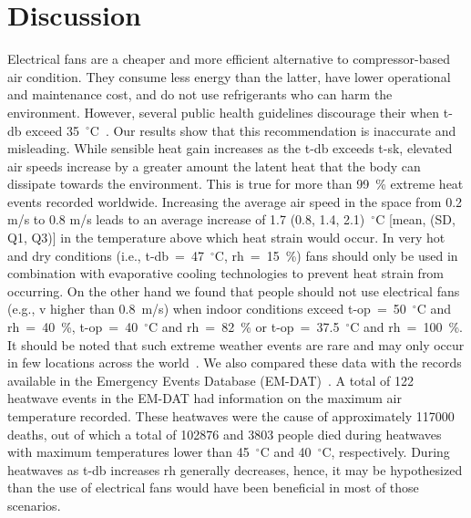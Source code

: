 
\section{Discussion}\label{sec:discussion}

Electrical fans are a cheaper and more efficient alternative to compressor-based air condition.
They consume less energy than the latter, have lower operational and maintenance cost, and do not use refrigerants who can harm the environment.
However, several public health guidelines discourage their when \acf{t-db} exceed 35~$^{\circ}$C~\cite{WMO2015}.
Our results show that this recommendation is inaccurate and misleading.
While sensible heat gain increases as the \ac{t-db} exceeds \acf{t-sk}, elevated air speeds increase by a greater amount the latent heat that the body can dissipate towards the environment.
This is true for more than 99~\% extreme heat events recorded worldwide.
Increasing the average air speed in the space from 0.2 m/s to 0.8 m/s leads to an average increase of 1.7 (0.8, 1.4, 2.1)~$^{\circ}$C [mean, (SD, Q1, Q3)] in the temperature above which heat strain would occur.
In very hot and dry conditions (i.e., \ac{t-db}~=~47~$^{\circ}$C, \ac{rh}~=~15~\%) fans should only be used in combination with evaporative cooling technologies to prevent heat strain from occurring.
On the other hand we found that people should not use electrical fans (e.g., \ac{v} higher than 0.8~m/s) when indoor conditions exceed \ac{t-op}~=~50~$^{\circ}$C and \ac{rh}~=~40~\%, \ac{t-op}~=~40~$^{\circ}$C and \ac{rh}~=~82~\% or \ac{t-op}~=~37.5~$^{\circ}$C and \ac{rh}~=~100~\%.
It should be noted that such extreme weather events are rare and may only occur in few locations across the world~\cite{ASHRA2017}.
We also compared these data with the records available in the Emergency Events Database (EM-DAT)~\cite{EMDATThe70:online}.
A total of 122 heatwave events in the EM-DAT had information on the maximum air temperature recorded.
These heatwaves were the cause of approximately 117000 deaths, out of which a total of 102876 and 3803 people died during heatwaves with maximum temperatures lower than 45~$^{\circ}$C and 40~$^{\circ}$C, respectively.
During heatwaves as \ac{t-db} increases \ac{rh} generally decreases, hence, it may be hypothesized than the use of electrical fans would have been beneficial in most of those scenarios.

